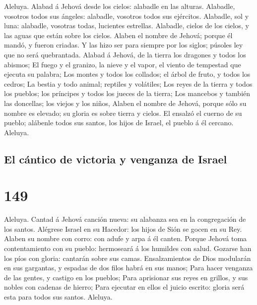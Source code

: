  Aleluya. Alabad á Jehová desde los cielos: alabadle en
las alturas.  Alabadle, vosotros todos sus ángeles:
alabadle, vosotros todos sus ejércitos.  Alabadle, sol y
luna: alabadle, vosotras todas, lucientes estrellas. 
Alabadle, cielos de los cielos, y las aguas que están sobre los cielos.
 Alaben el nombre de Jehová; porque él mandó, y fueron
criadas.  Y las hizo ser para siempre por los siglos;
púsoles ley que no será quebrantada.  Alabad á Jehová, de
la tierra los dragones y todos los abismos;  El fuego y el
granizo, la nieve y el vapor, el viento de tempestad que ejecuta su
palabra;  Los montes y todos los collados; el árbol de
fruto, y todos los cedros;  La bestia y todo animal;
reptiles y volátiles;  Los reyes de la tierra y todos los
pueblos; los príncipes y todos los jueces de la tierra; 
Los mancebos y también las doncellas; los viejos y los niños,
 Alaben el nombre de Jehová, porque sólo su nombre es
elevado; su gloria es sobre tierra y cielos.  El ensalzó
el cuerno de su pueblo; alábenle todos sus santos, los hijos de Israel,
el pueblo á él cercano. Aleluya.

\hypertarget{el-cuxe1ntico-de-victoria-y-venganza-de-israel}{%
\subsection{El cántico de victoria y venganza de
Israel}\label{el-cuxe1ntico-de-victoria-y-venganza-de-israel}}

\hypertarget{section-148}{%
\section{149}\label{section-148}}

 Aleluya. Cantad á Jehová canción nueva: su alabanza sea
en la congregación de los santos.  Alégrese Israel en su
Hacedor: los hijos de Sión se gocen en su Rey.  Alaben su
nombre con corro: con adufe y arpa á él canten.  Porque
Jehová toma contentamiento con su pueblo: hermoseará á los humildes con
salud.  Gozarse han los píos con gloria: cantarán sobre
sus camas.  Ensalzamientos de Dios modularán en sus
gargantas, y espadas de dos filos habrá en sus manos; 
Para hacer venganza de las gentes, y castigo en los pueblos;
 Para aprisionar sus reyes en grillos, y sus nobles con
cadenas de hierro;  Para ejecutar en ellos el juicio
escrito: gloria será esta para todos sus santos. Aleluya.

